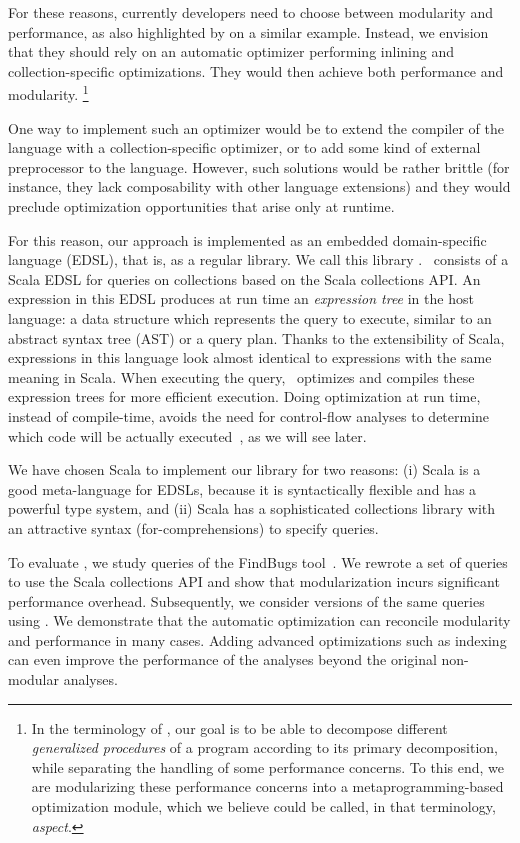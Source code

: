 For these reasons, currently developers need to choose between modularity and
performance, as also highlighted by
\citet{AOP} on a similar example.
Instead, we envision that they should rely on an automatic optimizer performing inlining
and collection-specific optimizations. They would then achieve both performance and modularity.%
\footnote{In the terminology of \citet{AOP}, our goal is to be able to decompose
different \emph{generalized procedures} of a program according to its primary
decomposition, while separating the handling of some performance concerns. To
this end, we are modularizing these performance concerns into a
metaprogramming-based optimization module, which we believe
could be called, in that terminology, \emph{aspect}.}

One way to implement such an optimizer would be to extend the compiler of the language with a collection-specific optimizer, or 
to add some kind of external preprocessor to the language. However, such solutions would be rather brittle (for instance, they lack
composability with other language extensions) and they would preclude optimization opportunities that arise only at runtime.

For this reason, our approach is implemented as an embedded domain-specific language (EDSL), that is, as a regular library.
We call this library \LoSDef. \LoS\ consists of a Scala EDSL for queries on collections based on the Scala collections API\@.
An expression in this EDSL produces at run time an \emph{expression tree} in the host language: a data structure which represents the query to execute, similar to an abstract syntax tree (AST) or a query plan. Thanks to the extensibility of Scala, expressions in this language look almost identical to expressions with the same meaning in Scala.
When executing the query, \LoS\ optimizes and compiles these expression trees for more efficient execution. Doing optimization at run time, instead of compile-time, avoids the need for control-flow analyses to determine which code will be actually executed~\citep{Chambers10}, as we will see later.

We have chosen Scala \citep{Odersky11book} to implement our library for two reasons: (i) Scala is a good meta-language for EDSLs, because it is syntactically
flexible and has a powerful type system, and (ii) Scala has a sophisticated collections library with an attractive syntax (for-comprehensions) to specify queries.

To evaluate \LoS, we study queries of the FindBugs tool~\citep{DBLP:journals/sigplan/HovemeyerP04}.
We rewrote a set of queries to use the Scala collections API and show that modularization incurs significant performance overhead. Subsequently, we consider versions of the same queries using \LoS{}.
We demonstrate that the automatic optimization can reconcile modularity and performance in many cases. Adding advanced optimizations such as indexing can even improve the performance of the analyses beyond the original non-modular analyses.
 
